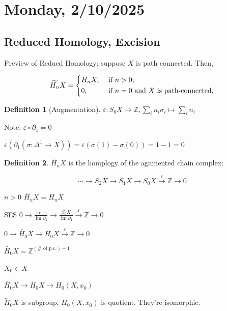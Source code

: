 \documentclass{article}
\theoremstyle{definition}
\newtheorem*{definition}{Definition}
\begin{document}
    \section*{Monday, 2/10/2025}
    
    \subsection*{Reduced Homology, Excision}

    Preview of Redued Homology: suppose \(X\) is path connected. Then,

    \[
        \widetilde{H_n} X = \begin{dcases}
            H_n X, &\text{ if } n > 0 ;\\
            0, &\text{ if } n = 0 \text{ and } X \text{ is path-connected}.
        \end{dcases}
    \]
    
    \begin{definition}
        [Augmentation] \(\varepsilon: S_0 X \to \mathbb{Z} , \sum_{i} n_i \sigma_i \mapsto \sum_{i} n_i\) 
    \end{definition}

    Note: \(\varepsilon \circ \partial_1 = 0\)

    \(\varepsilon (\partial_1 (\sigma: \Delta^1 \to X)) = \varepsilon (\sigma(1) - \sigma(0)) = 1-1 = 0\) 

    \begin{definition}
        \(\widetilde{H_n} X\) is the homplogy of the agumented chain complex:

        \[
            \cdots \to S_2 X \to S_1 X \to S_0 X \xrightarrow{\varepsilon} \mathbb{Z} \to 0
        \]

        \(n > 0\) \(\widetilde{H_n} X = H_n X\) 
        
        SES \(0 \to \frac{\ker \varepsilon}{\operatorname{im} \partial_1} \to \frac{S_0 X}{\operatorname{im} \partial_1} \xrightarrow{\varepsilon} \mathbb{Z} \to 0\)
        
        \(0 \to \widetilde{H_0} X \to H_0 X \xrightarrow{\varepsilon} \mathbb{Z} \to 0\) 

        \(\widetilde{H_0} X = \mathbb{Z}^{(\# \text{ of p.c.})-1}\) 
    \end{definition}

    \(X_0 \in X\) 

    \(\widetilde{H_0} X \to H_0 X \to H_0(X, x_0)\) 

    \(\widetilde{H}_0 X\) is subgroup, \(H_0(X,x_0)\) is quotient. They're isomorphic.
\end{document}

